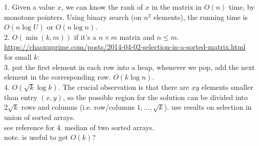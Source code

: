 \documentclass{article}
\newcommand{\Acknowledgements}[1]{\ \\{\bf Acknowledgements:} #1}
\begin{document}

1. Given a value $x$, we can know the rank of $x$ in the matrix in $O(n)$ time, by monotone pointers. Using binary search (on $n^2$ elements), the running time is $O(n\log U)$ or $O(n\log n)$.\\
2. $O(\min(k,m))$ if it's a $n\times m$ matrix and $n\leq m$.\\ \url{https://chaoxuprime.com/posts/2014-04-02-selection-in-a-sorted-matrix.html}\\

for small $k$:\\
3. put the first element in each row into a heap, whenever we pop, add the next element in the corresponding row. $O(k\log n)$.\\
4. $O(\sqrt k\log k)$. The crucial observation is that there are $xy$ elements smaller than entry $(x,y)$, so the possible region for the solution can be divided into $2\sqrt k$ rows and columns (i.e. row/columns $1,\dots,\sqrt k$). use results on selection in union of sorted arrays.\\
see reference for 4. median of two sorted arrays.\\

note. is \cite{frederickson1993optimal} useful to get $O(k)$?\\






\end{document}
